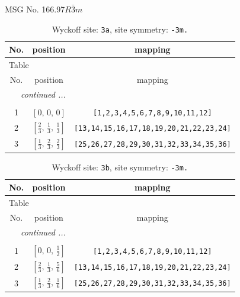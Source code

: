 \documentclass[fleqn,8pt]{jsarticle}
\begin{document}
\setcounter{MaxMatrixCols}{32}

\renewcommand{\tablename}{Table~}
\renewcommand{\figurename}{Figure~}
\begin{center}
\LARGE
MSG No. 166.97\quad$R\bar{3}m$
\end{center}
\renewcommand{\arraystretch}{1.2}
\begin{longtable}{ccc}
\caption{Wyckoff site: {\tt 3a}, site symmetry: {\tt -3m.}}
 \\
 \hline \hline
No. & position & mapping \\ \hline \endfirsthead

\multicolumn{2}{l}{\tablename\ \thetable{}} \\
 \hline \hline
No. & position & mapping \\ \hline \endhead

 \hline \hline
\multicolumn{2}{r}{\footnotesize\it continued ...} \\ \endfoot

 \hline \hline
\multicolumn{2}{r}{} \\ \endlastfoot

1 & $\left[ 0,\, 0,\, 0 \right]$ & {\tt [1,2,3,4,5,6,7,8,9,10,11,12]} \\ \hline
2 & $\left[ \frac{2}{3},\, \frac{1}{3},\, \frac{1}{3} \right]$ & {\tt [13,14,15,16,17,18,19,20,21,22,23,24]} \\ \hline
3 & $\left[ \frac{1}{3},\, \frac{2}{3},\, \frac{2}{3} \right]$ & {\tt [25,26,27,28,29,30,31,32,33,34,35,36]} \\
\end{longtable}
\renewcommand{\arraystretch}{1.2}
\begin{longtable}{ccc}
\caption{Wyckoff site: {\tt 3b}, site symmetry: {\tt -3m.}}
 \\
 \hline \hline
No. & position & mapping \\ \hline \endfirsthead

\multicolumn{2}{l}{\tablename\ \thetable{}} \\
 \hline \hline
No. & position & mapping \\ \hline \endhead

 \hline \hline
\multicolumn{2}{r}{\footnotesize\it continued ...} \\ \endfoot

 \hline \hline
\multicolumn{2}{r}{} \\ \endlastfoot

1 & $\left[ 0,\, 0,\, \frac{1}{2} \right]$ & {\tt [1,2,3,4,5,6,7,8,9,10,11,12]} \\ \hline
2 & $\left[ \frac{2}{3},\, \frac{1}{3},\, \frac{5}{6} \right]$ & {\tt [13,14,15,16,17,18,19,20,21,22,23,24]} \\ \hline
3 & $\left[ \frac{1}{3},\, \frac{2}{3},\, \frac{1}{6} \right]$ & {\tt [25,26,27,28,29,30,31,32,33,34,35,36]} \\
\end{longtable}
\end{document}
